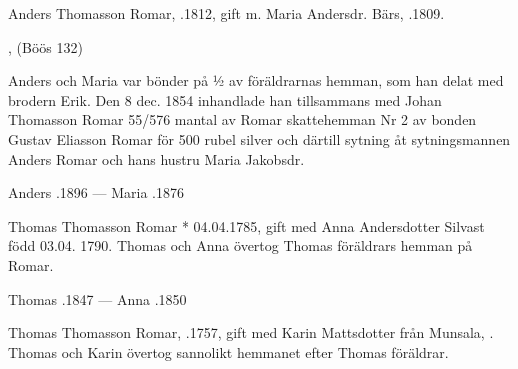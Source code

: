 %
Anders Thomasson Romar, .1812, gift m. Maria Andersdr. Bärs, .1809.
\begin{jhchildren}
  \item {}
  \item {}
  \item {}
  \item {}
  \item {}
  \item {}, (Böös 132)
  \item {}
  \item {}
\end{jhchildren}
Anders och Maria var bönder på ½ av föräldrarnas hemman, som han delat med brodern Erik. Den 8 dec. 1854 inhandlade han tillsammans med Johan Thomasson Romar 55/576 mantal av Romar skattehemman Nr 2 av bonden Gustav Eliasson Romar för 500 rubel silver och därtill sytning åt sytningsmannen Anders Romar och hans hustru Maria Jakobsdr.

Anders .1896  ---  Maria .1876


%
Thomas Thomasson Romar * 04.04.1785, gift med Anna Andersdotter Silvast född 03.04. 1790.
Thomas och Anna övertog Thomas föräldrars hemman på Romar.
\begin{jhchildren}
  \item {}
  \item {}
\end{jhchildren}

Thomas .1847  ---  Anna .1850


%
Thomas Thomasson Romar, .1757,  gift med Karin Mattsdotter från Munsala, . Thomas och Karin övertog sannolikt hemmanet efter Thomas föräldrar.
\begin{jhchildren}
  \item {}
\end{jhchildren}

